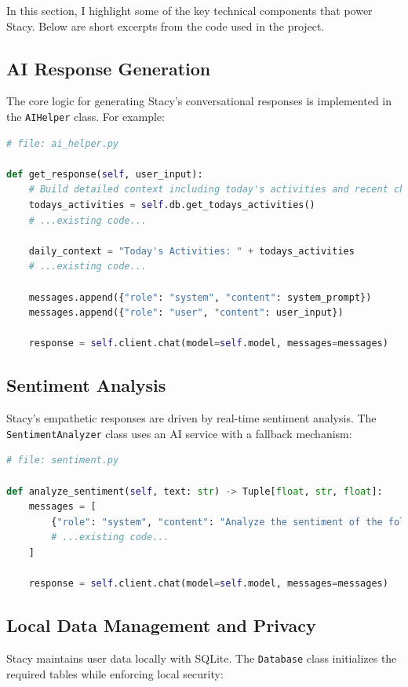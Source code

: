 \documentclass[12pt]{article}
\begin{document}
In this section, I highlight some of the key technical components that power Stacy. Below are short excerpts from the code used in the project.

\subsection{AI Response Generation}
The core logic for generating Stacy's conversational responses is implemented in the \texttt{AIHelper} class. For example:

\begin{lstlisting}[language=Python, caption=AI Response Handler, label=lst:ai_helper]
# file: ai_helper.py

def get_response(self, user_input):
    # Build detailed context including today's activities and recent chats
    todays_activities = self.db.get_todays_activities()
    # ...existing code...
    
    daily_context = "Today's Activities: " + todays_activities
    # ...existing code...
    
    messages.append({"role": "system", "content": system_prompt})
    messages.append({"role": "user", "content": user_input})
    
    response = self.client.chat(model=self.model, messages=messages)
\end{lstlisting}

\subsection{Sentiment Analysis}
Stacy's empathetic responses are driven by real-time sentiment analysis. The \texttt{SentimentAnalyzer} class uses an AI service with a fallback mechanism:

\begin{lstlisting}[language=Python, caption=Sentiment Analysis, label=lst:sentiment]
# file: sentiment.py

def analyze_sentiment(self, text: str) -> Tuple[float, str, float]:
    messages = [
        {"role": "system", "content": "Analyze the sentiment of the following text."},
        # ...existing code...
    ]
    
    response = self.client.chat(model=self.model, messages=messages)
\end{lstlisting}

\subsection{Local Data Management and Privacy}
Stacy maintains user data locally with SQLite. The \texttt{Database} class initializes the required tables while enforcing local security:
\end{document}
